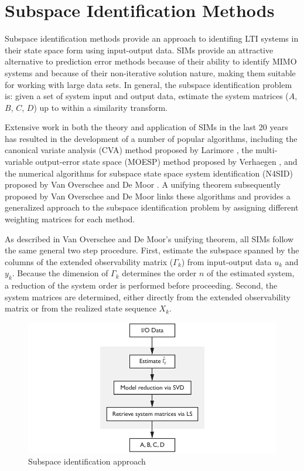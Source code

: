 \chapter{Subspace Identification Methods}\label{theory}
Subspace identification methods provide an approach to identifing LTI systems in their state space form using input-output data. SIMs provide an attractive alternative to prediction error methods because of their ability to identify MIMO systems and because of their non-iterative solution nature, making them suitable for working with large data sets. In general, the subspace identification problem is: given a set of system input and output data, estimate the system matrices ($A$, $B$, $C$, $D$) up to within a similarity transform. 

Extensive work in both the theory and application of SIMs in the last 20 years has resulted in the development of a number of popular algorithms, including the canonical variate analysis (CVA) method proposed by Larimore \cite{larimore1990canonical}, the multi-variable output-error state space (MOESP) method proposed by Verhaegen \cite{verhaegen1992subspace}, and the numerical algorithms for subspace state space system identification (N4SID) proposed by Van Overschee and De Moor \cite{van1994n4sid}. A unifying theorem subsequently proposed by Van Overschee and De Moor \cite{van1995unifying} links these algorithms and provides a generalized approach to the subspace identification problem by assigning different weighting matrices for each method.

As described in Van Overschee and De Moor's unifying theorem, all SIMs follow the same general two step procedure. First, estimate the subspace spanned by the columns of the extended observability matrix ($\Gamma_k$) from input-output data $u_k$ and $y_k$. Because the dimension of $\Gamma_k$ determines the order $n$ of the estimated system, a reduction of the system order is performed before proceeding. Second, the system matrices are determined, either directly from the extended observability matrix or from the realized state sequence $X_k$.
\begin{figure}[htb!]
	\centering
	\includegraphics{../fig/sim_flow_diagram.pdf}
	\caption{Subspace identification approach}
\end{figure}


